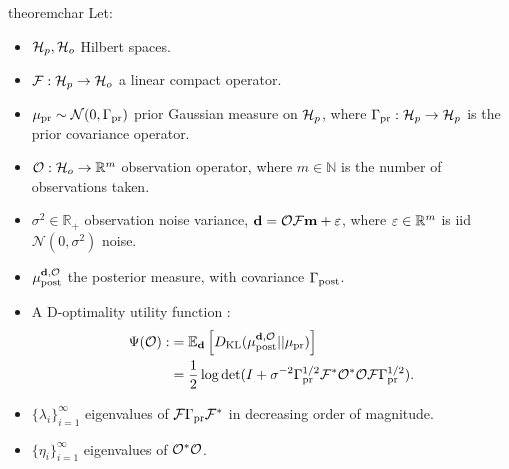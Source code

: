 \begin{restatable}{theorem}{char}\label{thm:char}
  Let:
  \begin{itemize}
  \item $\mathcal{H}_p, \mathcal{H}_o$ Hilbert spaces.
  \item $\mathcal{F}:\mathcal{H}_p \to \mathcal{H}_o$ a linear compact operator.
  \item $\mu_{\textup{pr}} \sim \mathcal{N}(0, \Gamma_{\textup{pr}})$ prior Gaussian measure on $\mathcal{H}_p$,
    where $\Gamma_{\textup{pr}}:\mathcal{H}_p \to \mathcal{H}_p$ is the prior covariance operator.
  \item $\mathcal{O}: \mathcal{H}_o \to \mathbb{R}^m$ observation operator, where $m
    \in \mathbb{N}$ is the number of observations taken. 
  \item $\sigma^2 \in \mathbb{R}_{+}$ observation noise variance,
    $\mathbf{d} = \mathcal{O} \mathcal{F} \mathbf{m} + \varepsilon$, where $\varepsilon \in \mathbb{R}^m$
    is iid $\mathcal{N}(0, \sigma^2)$ noise.
  \item $\mu_{\textup{post}}^{\mathbf{d}, \mathcal{O}}$ the posterior measure, with covariance $\Gamma_{\textup{post}}$.
  \item A D-optimality utility function
    \cite{AlexanderianGloorGhattas14}:
    \begin{align*}
      \begin{split}
        \tar(\obs) :&= \mathbb{E}_{\data}\left [ D_{\text{KL}} (\post || \pr ) \right ] \\
        &= \frac12 \log \det ( I + \sigma^{-2} \prcov^{1/2} \fwd ^*
        \obs^* \obs \fwd \prcov^{1/2}).
      \end{split}
    \end{align*}
  \item $\{\lambda_i\}_{i=1}^\infty$ eigenvalues of $\mathcal{F}\Gamma_{\textup{pr}}\mathcal{F}^*$
    in decreasing order of magnitude.
  \item $\{\eta_i\}_{i=1}^\infty$ eigenvalues of $\mathcal{O}^*\mathcal{O}$.
  \end{itemize}


\end{restatable}
